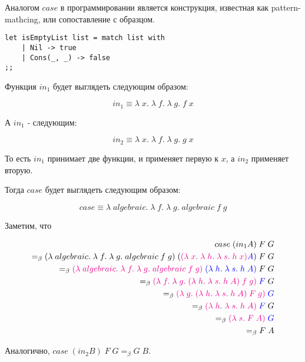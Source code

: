 Аналогом $case$ в программировании является конструкция, известная как pattern-mathcing, или сопоставление с образцом.

\begin{verbatim}
let isEmptyList list = match list with
	| Nil -> true
	| Cons(_, _) -> false
;;
\end{verbatim}

Функция $in_1$ будет выглядеть следующим образом: 

$$in_1 \equiv \lambda \; x. \; \lambda \; f. \; \lambda \; g. \; f \; x$$

А $in_1$ -  следующим:

$$in_2 \equiv \lambda \; x. \; \lambda \; f. \; \lambda \; g. \; g \; x$$

То есть $in_1$ принимает две функции, и применяет первую к $x$, а $in_2$ применяет вторую.

Тогда $case$ будет выглядеть следующим образом:

$$case \equiv \lambda \; algebraic. \; \lambda \; f. \; \lambda \; g. \; algebraic \; f \; g$$

Заметим, что 

\begin{align*}
case \; (in_1 A) \; F \; G \\ =_\beta (\lambda \; algebraic. \; \lambda \; f. \; \lambda \; g. \; algebraic \; f \; g) \; (\textcolor{magenta}{(\lambda \; x. \; \lambda \; h. \; \lambda \; s. \; h \; x)} \textcolor{blue}{A}) \; F \; G \\ =_\beta  \textcolor{magenta}{(\lambda \; algebraic. \; \lambda \; f. \; \lambda \; g. \; algebraic \; f \; g)} \; \textcolor{blue}{(\lambda \; h. \; \lambda \; s. \; h \; A)} \; F \; G \\ =_\beta \textcolor{magenta}{(\lambda \; f. \; \lambda \; g. \; (\lambda \; h. \; \lambda \; s. \; h \; A) \; f \; g)} \; \textcolor{blue}{F} \; G \\ =_\beta \textcolor{magenta}{(\lambda \; g. \; (\lambda \; h. \; \lambda \; s. \; h \; A) \; F \; g)} \; \textcolor{blue}{G}  \\ =_\beta \textcolor{magenta}{(\lambda \; h. \; \lambda \; s. \; h \; A)} \; \textcolor{blue}{F} \; G \\ =_\beta \textcolor{magenta}{(\lambda \; s. \; F \; A)} \; \textcolor{blue}{G} \\ =_\beta F \; A
\end{align*}

Аналогично, $case \; (in_2 B) \; F \; G =_\beta G \; B$. 

